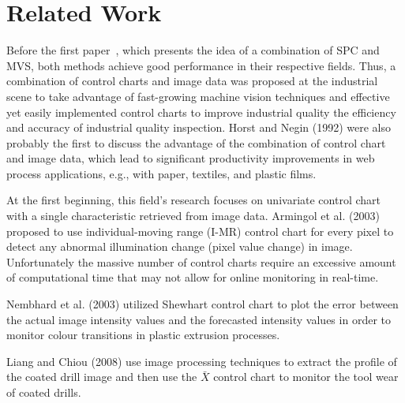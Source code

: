 \chapter{Related Work}
\label{cp:RelatedWork}

\begin{comment}
Here you need to write your related work and cite properly. For example, one of the most influential researchers in ~\ac{DL} is Yann LeCun with the Nature Article \textit{Deep learning} \cite{lecun2015deep}. In total, you should refer to preferably approximately 50 papers (not less than 40 papers).

Here, it is highly recommended to start writing this part as soon as you start reading any papers. It will take you a lot of time to do so and can also help you track the papers that you have been reading.
\end{comment}

Before the first paper~\cite{horst1992vision}, which presents the idea of a combination of SPC and MVS, both methods achieve good performance in their respective fields. Thus, a combination of control charts and image data was proposed at the industrial scene to take advantage of fast-growing machine vision techniques and effective yet easily implemented control charts to improve industrial quality the efficiency and accuracy of industrial quality inspection. Horst and Negin (1992) were also \nocite{horst1992vision}probably the first to discuss the advantage of the combination of control chart and image data, which lead to significant productivity improvements in web process applications, e.g., with paper, textiles, and plastic films.

At the first beginning, this field's research focuses on univariate control chart with a single characteristic retrieved from image data. Armingol et al. (2003) \nocite{armingol2003statistical} proposed to use individual-moving range (I-MR) control chart for every pixel to detect any abnormal illumination change (pixel value change) in image. Unfortunately the massive number of control charts require an excessive amount of computational time that may not allow for online monitoring in real-time.

Nembhard et al. (2003)\nocite{nembhard2003integrated} utilized Shewhart control chart to plot the error between the actual image intensity values and the forecasted intensity values in order to monitor colour transitions in plastic extrusion processes.

Liang and Chiou (2008)\nocite{liang2008vision} use image processing techniques to extract the profile of the coated drill image and then use the $\bar{X}$ control chart to monitor the tool wear of coated drills.

